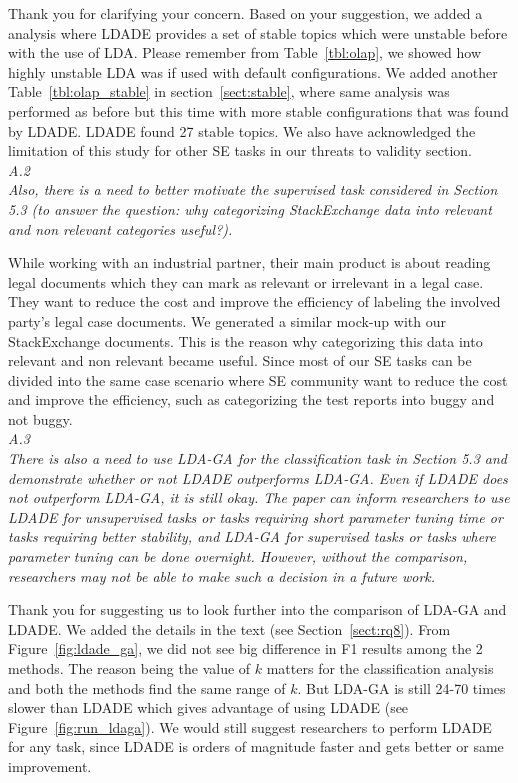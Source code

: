 \documentclass[twocolumn,5p,sort&compress]{elsarticle}
\theoremstyle{break}
\begin{document}
Thank you for clarifying your concern. Based on your suggestion, we added a analysis where LDADE provides a set of stable topics which were unstable before with the use of LDA. Please remember from Table~\ref{tbl:olap}, we showed how highly unstable LDA was if used with default configurations. We added another Table~\ref{tbl:olap_stable} in section~\ref{sect:stable}, where same analysis was performed as before but this time with more stable configurations that was found by LDADE. LDADE found 27 stable topics. We also have acknowledged the limitation of this study for other SE tasks in our threats to validity section.\\

\textit{A.2\\}
{\em Also, there is a need to better motivate the supervised task considered in Section 5.3  (to answer the question: why categorizing StackExchange data into relevant and non relevant categories useful?).\\}

While working with an industrial partner, their main product is about reading legal documents which they can mark as relevant or irrelevant in a legal case. They want to reduce the cost and improve the efficiency of labeling the involved party's legal case documents. We generated a similar mock-up with our StackExchange documents. This is the reason why categorizing this data into relevant and non relevant became useful. Since most of our SE tasks can be divided into the same case scenario where SE community want to reduce the cost and improve the efficiency, such as categorizing the test reports into buggy and not buggy.\\

\textit{A.3\\}
{\em There is also a need to use LDA-GA for the classification task in Section 5.3 and demonstrate whether or not LDADE outperforms LDA-GA. Even if LDADE does not outperform LDA-GA, it is still okay. The paper can inform researchers to use LDADE for unsupervised tasks or tasks requiring short parameter tuning time or tasks requiring better stability, and LDA-GA for supervised tasks or tasks where parameter tuning can be done overnight. However, without the comparison, researchers may not be able to make such a decision in a future work.\\}

Thank you for suggesting us to look further into the comparison of LDA-GA and LDADE. We added the details in the text (see Section~\ref{sect:rq8}). From Figure~\ref{fig:ldade_ga}, we did not see big difference in F1 results among the 2 methods. The reason being the value of $k$ matters for the classification analysis and both the methods find the same range of $k$. But LDA-GA is still 24-70 times slower than LDADE which gives advantage of using LDADE (see Figure~\ref{fig:run_ldaga}). We would still suggest researchers to perform LDADE for any task, since LDADE is orders of magnitude faster and gets better or same improvement.\\
\end{document}

